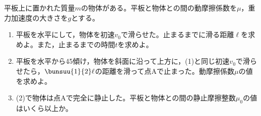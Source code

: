 \item 平板上に置かれた質量$m$の物体がある。平板と物体との間の動摩擦係数を$\mu $，重力加速度の大きさを$g$とする。
\begin{enumerate}
    \item 平板を水平にして，物体を初速$v_0$で滑らせた。止まるまでに滑る距離$\ell $を求めよ。また，止まるまでの時間$t$を求めよ。
    \item 平板を水平から45\Deg 傾け，物体を斜面に沿って上方に，(1)と同じ初速$v_0$で滑らせたら，$\bunsuu{1}{2}\ell $の距離を滑って点Aで止まった。動摩擦係数$\mu $の値を求めよ。
    \item (2)で物体は点Aで完全に静止した。平板と物体との間の静止摩擦整数$\mu _0$の値はいくら以上か。
\end{enumerate}
